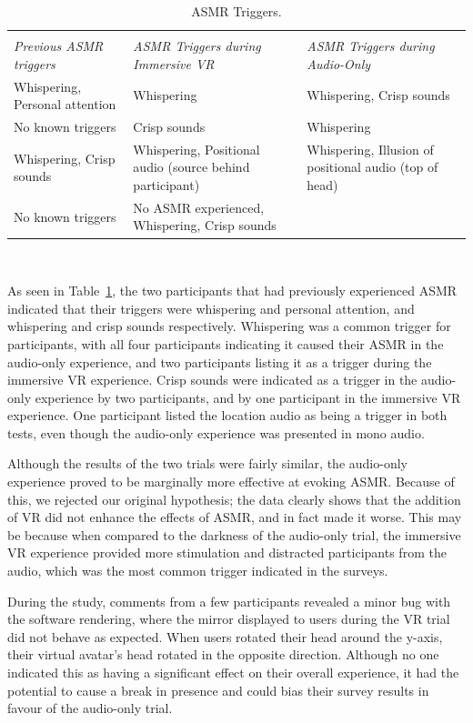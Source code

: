 \documentclass{sigchi}
\begin{document}
\begin{table}[htb]
  \centering
  \begin{tabular}{p{6cm} p{6cm} p{6cm}}
    \toprule\\
    {\textit{Previous ASMR triggers}} & {\textit{ASMR Triggers during Immersive VR}} & {\textit{ASMR Triggers during Audio-Only}}\\
    \midrule
    Whispering, Personal attention & Whispering & Whispering, Crisp sounds \\
    No known triggers & Crisp sounds & Whispering \\
    Whispering, Crisp sounds & Whispering, Positional audio (source behind participant) & Whispering, Illusion of positional audio (top of head)\\
    No known triggers & No ASMR experienced, Whispering, Crisp sounds\\
     \bottomrule
  \end{tabular}
  \caption{ASMR Triggers.}~\label{tab:triggers}
\end{table}

As seen in Table~\ref{tab:triggers}, the two participants that had previously experienced ASMR indicated that their triggers were whispering and personal attention, and whispering and crisp sounds respectively. Whispering was a common trigger for participants, with all four participants indicating it caused their ASMR in the audio-only experience, and two participants listing it as a trigger during the immersive VR experience. Crisp sounds were indicated as a trigger in the audio-only experience by two participants, and by one participant in the immersive VR experience. One participant listed the location audio as being a trigger in both tests, even though the audio-only experience was presented in mono audio.



Although the results of the two trials were fairly similar, the audio-only experience proved to be marginally more effective at evoking ASMR. Because of this, we rejected our original hypothesis; the data clearly shows that the addition of VR did not enhance the effects of ASMR, and in fact made it worse. This may be because when compared to the darkness of the audio-only trial, the immersive VR experience provided more stimulation and distracted participants from the audio, which was the most common trigger indicated in the surveys.

During the study, comments from a few participants revealed a minor bug with the software rendering, where the mirror displayed to users during the VR trial did not behave as expected. When users rotated their head around the y-axis, their virtual avatar's head rotated in the opposite direction. Although no one indicated this as having a significant effect on their overall experience, it had the potential to cause a break in presence and could bias their survey results in favour of the audio-only trial.
\end{document}
